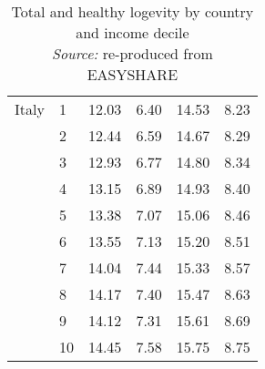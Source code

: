 \begin{table}
\begin{tabular}{llrrrr}
Italy & 1  &   12.03 &   6.40 &  14.53 &   8.23 \\
            & 2  &   12.44 &   6.59 &  14.67 &   8.29 \\
            & 3  &   12.93 &   6.77 &  14.80 &   8.34 \\
            & 4  &   13.15 &   6.89 &  14.93 &   8.40 \\
            & 5  &   13.38 &   7.07 &  15.06 &   8.46 \\
            & 6  &   13.55 &   7.13 &  15.20 &   8.51 \\
            & 7  &   14.04 &   7.44 &  15.33 &   8.57 \\
            & 8  &   14.17 &   7.40 &  15.47 &   8.63 \\
            & 9  &   14.12 &   7.31 &  15.61 &   8.69 \\
            & 10 &   14.45 &   7.58 &  15.75 &   8.75 \\
\bottomrule
\end{tabular}
\captionsetup{justification=centering}
\caption{Total and healthy logevity by country and income decile \\ 
\textit{Source:} re-produced from EASYSHARE }
\end{table}




